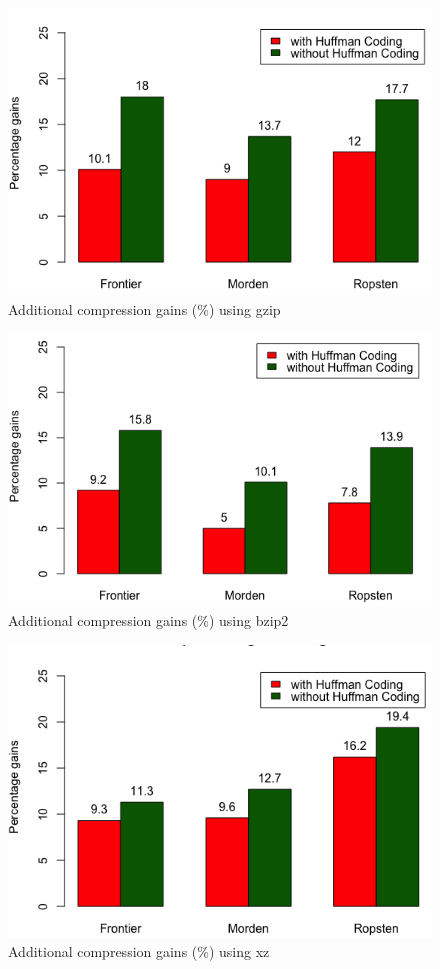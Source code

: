 \pagebreak
\begin{figure}
	\includegraphics[scale=0.45]{plots/gzip}
	\caption{Additional compression gains (\%) using gzip}
	\label{fig:gzip}
\end{figure}
\begin{figure}
	\includegraphics[scale=0.45]{plots/bzip2}
	\caption{Additional compression gains (\%) using bzip2}
	\label{fig:bzip2}
\end{figure}
\begin{figure}
	\includegraphics[scale=0.45]{plots/xz}
	\caption{Additional compression gains (\%) using xz}
	\label{fig:xz}
\end{figure}

